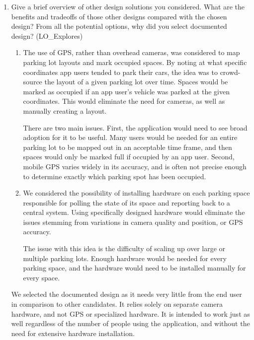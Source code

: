 \documentclass[12pt, titlepage]{article}
\begin{document}
\begin{enumerate}
\begin{enumerate}
  \end{enumerate}
  
  \item Give a brief overview of other design solutions you considered.  What
  are the benefits and tradeoffs of those other designs compared with the chosen
  design?  From all the potential options, why did you select documented design?
  (LO\_Explores)
  
  \begin{enumerate}
  \item The use of GPS, rather than overhead cameras, was considered to map
  parking lot layouts and mark occupied spaces. By noting at what specific
  coordinates app users tended to park their cars, the idea was to crowd-source
  the layout of a given parking lot over time. Spaces would be marked as
  occupied if an app user's vehicle was parked at the given coordinates. This
  would eliminate the need for cameras, as well as manually creating a layout.

  There are two main issues. First, the application would need to see broad
  adoption for it to be useful. Many users would be needed for an entire parking
  lot to be mapped out in an acceptable time frame, and then spaces would only
  be marked full if occupied by an app user. Second, mobile GPS varies widely in
  its accuracy, and is often not precise enough to determine exactly which
  parking spot has been occupied.

  \item We considered the possibility of installing hardware on each parking
  space responsible for polling the state of its space and reporting back to a
  central system. Using specifically designed hardware would eliminate the
  issues stemming from variations in camera quality and position, or GPS
  accuracy.

  The issue with this idea is the difficulty of scaling up over large or
  multiple parking lots. Enough hardware would be needed for every parking
  space, and the hardware would need to be installed manually for every space.
  \end{enumerate}
  We selected the documented design as it needs very little from the end user in
  comparison to other candidates. It relies solely on separate camera hardware,
  and not GPS or specialized hardware. It is intended to work just as well
  regardless of the number of people using the application, and without the need
  for extensive hardware installation.
\end{enumerate}
\end{document}
